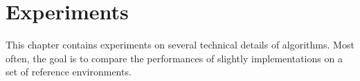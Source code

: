 \chapter{Experiments}

This chapter contains experiments on several technical details of algorithms. Most often, the goal is to compare the performances of slightly implementations on a set of reference environments.

%
%
%

%
%
%

